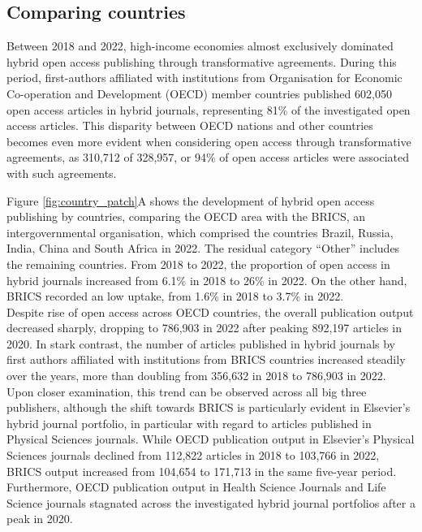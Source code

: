 \documentclass[a4paper,man,floatsintext,longtable,noextraspace,12pt]{apa6}
\begin{document}
\hypertarget{comparing-countries}{%
\subsection{Comparing countries}\label{comparing-countries}}

Between 2018 and 2022, high-income economies almost exclusively
dominated hybrid open access publishing through transformative
agreements. During this period, first-authors affiliated with
institutions from Organisation for Economic Co-operation and Development
(OECD) member countries published 602,050 open access articles in hybrid
journals, representing 81\% of the investigated open access articles.
This disparity between OECD nations and other countries becomes even
more evident when considering open access through transformative
agreements, as 310,712 of 328,957, or 94\% of open access articles were
associated with such agreements.

Figure \ref{fig:country_patch}A shows the development of hybrid open
access publishing by countries, comparing the OECD area with the BRICS,
an intergovernmental organisation, which comprised the countries Brazil,
Russia, India, China and South Africa in 2022. The residual category
``Other'' includes the remaining countries. From 2018 to 2022, the
proportion of open access in hybrid journals increased from 6.1\% in
2018 to 26\% in 2022. On the other hand, BRICS recorded an low uptake,
from 1.6\% in 2018 to 3.7\% in 2022.\\
Despite rise of open access across OECD countries, the overall
publication output decreased sharply, dropping to 786,903 in 2022 after
peaking 892,197 articles in 2020. In stark contrast, the number of
articles published in hybrid journals by first authors affiliated with
institutions from BRICS countries increased steadily over the years,
more than doubling from 356,632 in 2018 to 786,903 in 2022. Upon closer
examination, this trend can be observed across all big three publishers,
although the shift towards BRICS is particularly evident in Elsevier's
hybrid journal portfolio, in particular with regard to articles
published in Physical Sciences journals. While OECD publication output
in Elsevier's Physical Sciences journals declined from 112,822 articles
in 2018 to 103,766 in 2022, BRICS output increased from 104,654 to
171,713 in the same five-year period. Furthermore, OECD publication
output in Health Science Journals and Life Science journals stagnated
across the investigated hybrid journal portfolios after a peak in 2020.
\end{document}
